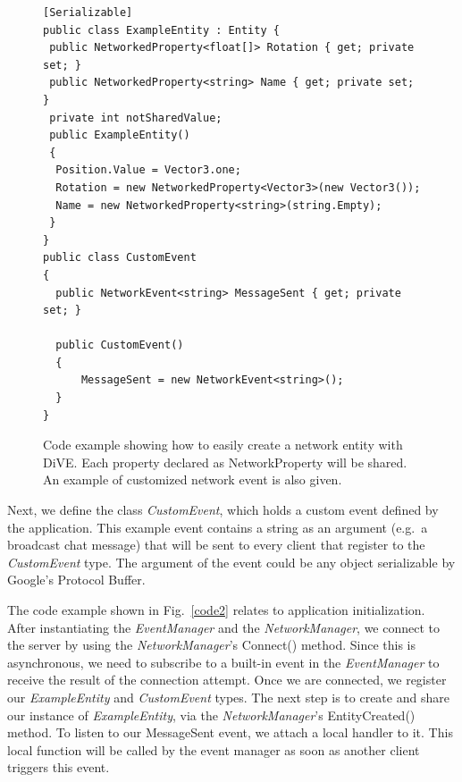 \documentclass[]{elsarticle}
\newcommand{\comment}[1]{{\color{red}{#1}}}
\begin{document}
\begin{figure}[!hbt]
\centering
\begin{lstlisting}
[Serializable]
public class ExampleEntity : Entity {
 public NetworkedProperty<float[]> Rotation { get; private set; }
 public NetworkedProperty<string> Name { get; private set; }
 private int notSharedValue;
 public ExampleEntity()
 {
  Position.Value = Vector3.one;
  Rotation = new NetworkedProperty<Vector3>(new Vector3());
  Name = new NetworkedProperty<string>(string.Empty);
 }
}
public class CustomEvent
{
  public NetworkEvent<string> MessageSent { get; private set; }

  public CustomEvent()
  {
      MessageSent = new NetworkEvent<string>();
  }
}
\end{lstlisting}
\caption{Code example showing how to easily create a network entity with DiVE. Each property declared as NetworkProperty will be shared. An example of customized network event is also given.}
\label{code1}
\end{figure}

Next, we define the class \textit{CustomEvent}, which holds a custom event defined by the application. This example event contains a string as an argument (e.g.~a broadcast chat message) that will be sent to every client that register to the \textit{CustomEvent} type. The argument of the event could be any object serializable by Google's Protocol Buffer.

The code example shown in Fig.~\ref{code2} relates to application initialization. After instantiating the \textit{EventManager} and the \textit{NetworkManager}, we connect to the server by using the \textit{NetworkManager}'s Connect() method. Since this is asynchronous, we need to subscribe to a built-in event in the \textit{EventManager} to receive the result of the connection attempt. Once we are connected, we register our \textit{ExampleEntity} and \textit{CustomEvent} types. The next step is to create and share our instance of \textit{ExampleEntity}, via the \textit{NetworkManager}'s EntityCreated() method.  To listen to our MessageSent event, we attach a local handler to it. This local function will be called by the event manager as soon as another client triggers this event.

\end{document}
